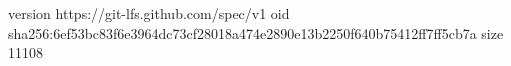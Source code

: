 version https://git-lfs.github.com/spec/v1
oid sha256:6ef53bc83f6e3964dc73cf28018a474e2890e13b2250f640b75412ff7ff5cb7a
size 11108
